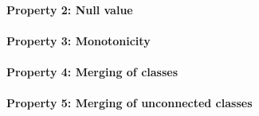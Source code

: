 \paragraph{Property 2: Null value}

\paragraph{Property 3: Monotonicity}

\paragraph{Property 4: Merging of classes}

\paragraph{Property 5: Merging of unconnected classes}

